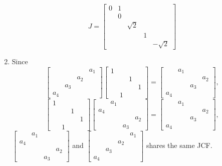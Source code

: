 \documentclass{article}
\begin{document}
\begin{enumerate}
\[J=\left[\begin{array}{rrrrr}
0&1\\&0\\&&\sqrt{2}\\&&&1\\&&&&-\sqrt{2}
\end{array}\right]\]
\item
Since
\[\left[\begin{array}{rrrr}
&&&a_1\\&&a_2\\&a_3\\a_4
\end{array}\right]\left[\begin{array}{rrrr}
1\\&&1\\&&&1\\&1
\end{array}\right]=\left[\begin{array}{rrrr}
&a_1\\&&&a_2\\&&a_3\\a_4
\end{array}\right],\]
\[\left[\begin{array}{rrrr}
1\\&&1\\&&&1\\&1
\end{array}\right]\left[\begin{array}{rrrr}
&a_1\\a_4\\&&&a_2\\&&a_3
\end{array}\right]=\left[\begin{array}{rrrr}
&a_1\\&&&a_2\\&&a_3\\a_4
\end{array}\right],\]
$\left[\begin{array}{rrrr}
&a_1\\a_4\\&&&a_2\\&&a_3
\end{array}\right]$ and $\left[\begin{array}{rrrr}
&&&a_1\\&&a_2\\&a_3\\a_4
\end{array}\right]$ shares the same JCF.\\

\end{enumerate}
\end{document}
